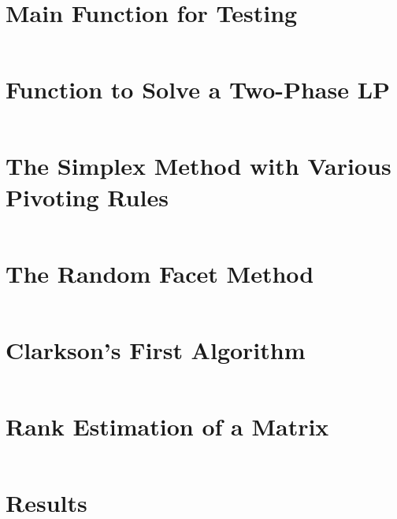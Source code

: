 \documentclass [12pt]{article}
\begin{document}
\newpage
\begin{appendices}
	\section{Main Function for Testing}
	\label{appendix:test}
  \inputminted[linenos,breaklines]{matlab}{src/test.m}
  \section{Function to Solve a Two-Phase LP}
  \label{appendix:evallp}
  \inputminted[linenos,breaklines]{matlab}{src/evallp.m}
  \section{The Simplex Method with Various Pivoting Rules}
  \label{appendix:simplex}
  \inputminted[linenos,breaklines]{matlab}{src/simplex.m}
  \section{The Random Facet Method}
  \label{appendix:randfacet}
  \inputminted[linenos,breaklines]{matlab}{src/simplex_random_facet.m}
  \section{Clarkson's First Algorithm}
  \label{appendix:clarkson}
  \inputminted[linenos,breaklines]{matlab}{src/clarkson.m}
  \section{Rank Estimation of a Matrix}
  \label{appendix:rank}
  \inputminted[linenos,breaklines]{matlab}{src/licols.m}
  \section{Results}
  \label{appendix:results}
  
\end{appendices}
\end{document}
